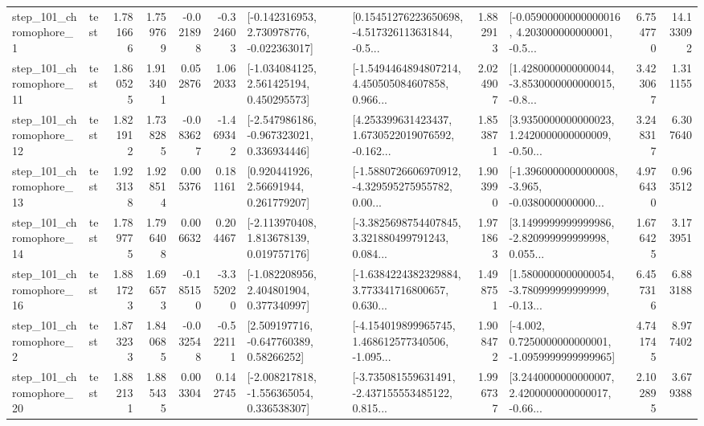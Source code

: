 \begin{tabular}{llrrrrllrlrr}
   step\_101\_chromophore\_1 &      test &      1.781666 &    1.759769 &     -0.021898 & -0.324603 &   [-0.142316953, 2.730978776, -0.022363017] &  [0.15451276223650698, -4.517326113631844, -0.5... &       1.882913 &  [-0.05900000000000016, 4.203000000000001, -0.5... &            6.754770 &         14.133092 \\
  step\_101\_chromophore\_11 &      test &      1.860525 &    1.913401 &      0.052876 &  1.062033 &    [-1.034084125, 2.561425194, 0.450295573] &  [-1.5494464894807214, 4.450505084607858, 0.966... &       2.024907 &  [1.4280000000000044, -3.8530000000000015, -0.8... &            3.423067 &          1.311155 \\
  step\_101\_chromophore\_12 &      test &      1.821912 &    1.738285 &     -0.083627 & -1.469342 &   [-2.547986186, -0.967323021, 0.336934446] &  [4.253399631423437, 1.6730522019076592, -0.162... &       1.853871 &  [3.9350000000000023, 1.2420000000000009, -0.50... &            3.248317 &          6.307640 \\
  step\_101\_chromophore\_13 &      test &      1.923138 &    1.928514 &      0.005376 &  0.181161 &      [0.920441926, 2.56691944, 0.261779207] &  [-1.5880726606970912, -4.329595275955782, 0.00... &       1.903990 &  [-1.3960000000000008, -3.965, -0.0380000000000... &            4.976430 &          0.963512 \\
  step\_101\_chromophore\_14 &      test &      1.789775 &    1.796408 &      0.006632 &  0.204467 &    [-2.113970408, 1.813678139, 0.019757176] &  [-3.3825698754407845, 3.321880499791243, 0.084... &       1.971863 &  [3.1499999999999986, -2.820999999999998, 0.055... &            1.676425 &          3.173951 \\
  step\_101\_chromophore\_16 &      test &      1.881723 &    1.696573 &     -0.185150 & -3.352020 &    [-1.082208956, 2.404801904, 0.377340997] &  [-1.6384224382329884, 3.773341716800657, 0.630... &       1.498751 &  [1.5800000000000054, -3.780999999999999, -0.13... &            6.457316 &          6.883188 \\
   step\_101\_chromophore\_2 &      test &      1.873233 &    1.840685 &     -0.032548 & -0.522111 &     [2.509197716, -0.647760389, 0.58266252] &  [-4.154019899965745, 1.468612577340506, -1.095... &       1.908472 &  [-4.002, 0.7250000000000001, -1.0959999999999965] &            4.741745 &          8.977402 \\
  step\_101\_chromophore\_20 &      test &      1.882131 &    1.885435 &      0.003304 &  0.142745 &   [-2.008217818, -1.556365054, 0.336538307] &  [-3.735081559631491, -2.437155553485122, 0.815... &       1.996737 &  [3.2440000000000007, 2.4200000000000017, -0.66... &            2.102895 &          3.679388 \\

\end{tabular}

